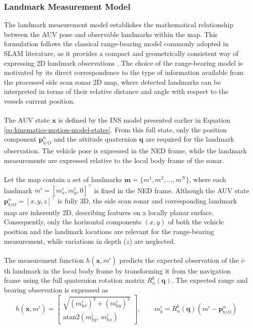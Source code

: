 \subsubsection{Landmark Measurement Model}
The landmark measurement model establishes the mathematical relationship between the AUV pose and observable landmarks within the map. This formulation follows the classical range-bearing model commonly adopted in SLAM literature, as it provides a compact and geometrically consistent way of expressing 2D landmark observations \cite{sensor_fusion_book} \cite{side_scan_sonar_master_thesis}. The choice of the range-bearing model is motivated by its direct correspondence to the type of information available from the processed side scan sonar 2D map, where detected landmarks can be interpreted in terms of their relative distance and angle with respect to the vessels current position.  
\\ \\
The AUV state $\mathbf{x}$ is defined by the INS model presented earlier in Equation \eqref{eq:kinematics-motion-model-states}. From this full state, only the position component $\mathbf{p}_{b/O}^{n}$ and the attitude quaternion $\mathbf{q}$ are required for the landmark observation. The vehicle pose is expressed in the NED frame, while the landmark measurements are expressed relative to the local body frame of the sonar.  
\\ \\
Let the map contain a set of landmarks $\mathbf{m} = \{ m^1, m^2, \dots, m^N \}$, where each landmark $m^i = [m_x^i, m_y^i, 0]^\top$ is fixed in the NED frame. Although the AUV state $\mathbf{p}_{b/O}^{n} = [x, y, z]^\top$ is fully 3D, the side scan sonar and corresponding landmark map are inherently 2D, describing features on a locally planar surface. Consequently, only the horizontal components $(x, y)$ of both the vehicle position and the landmark locations are relevant for the range-bearing measurement, while variations in depth ($z$) are neglected.  
\\ \\
The measurement function $h(\mathbf{x}, m^i)$ predicts the expected observation of the $i$-th landmark in the local body frame by transforming it from the navigation frame using the full quaternion rotation matrix $R_n^b(\mathbf{q})$. The expected range and bearing observation is expressed as
\begin{equation}
    h(\mathbf{x}, m^i) =
    \begin{bmatrix}
        \sqrt{(m_b^i{}_x)^2 + (m_b^i{}_y)^2} \\
        \mathrm{atan2}(m_b^i{}_y,\, m_b^i{}_x)
    \end{bmatrix},
    \qquad
    m_b^i = R_n^b(\mathbf{q}) \left( m^i - \mathbf{p}_{b/O}^{n} \right)
    \label{eq:range-bearing-model-deterministic}
\end{equation}
